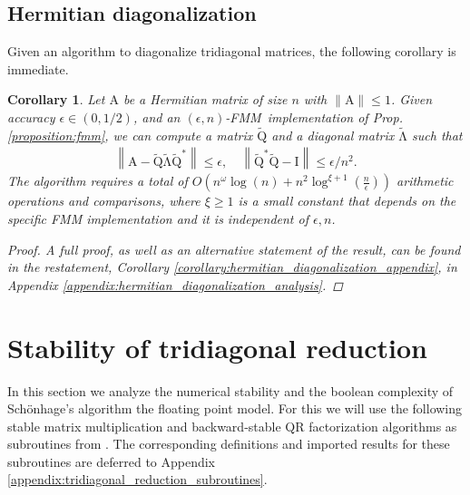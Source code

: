 \documentclass{article}
\newcommand{\lnorm}{\left\|}
\newcommand{\rnorm}{\right\|}
\newcommand{\lpar}{\left(}
\newcommand{\rpar}{\right)}
\newtheorem{corollary}{Corollary}[section]
\newcommand\matA{\boldsymbol{\mathrm{A}}}
\newcommand\matI{\boldsymbol{\mathrm{I}}}
\newcommand\matQtilde{\widetilde{\boldsymbol{\mathrm{Q}}}}
\newcommand\matLambdatilde{\widetilde{\boldsymbol{\mathrm{\Lambda}}}}
\newcommand{\cfmm}{\xi}
\newcommand{\fmmalgo}{FMM} \usepackage[utf8]{inputenc}
\begin{document}
    \subsection{Hermitian diagonalization}
    Given an algorithm to diagonalize tridiagonal matrices, the following corollary is immediate.
    \begin{corollary}
    \label{corollary:hermitian_diagonalization}
    Let $\matA$ be a Hermitian matrix of size $n$ with $\|\matA\|\leq 1$. Given accuracy $\epsilon\in(0,1/2)$, and an $(\epsilon,n)$-\fmmalgo\   implementation of Prop. \ref{proposition:fmm}, we can compute a matrix $\matQtilde$ and a diagonal matrix $\matLambdatilde$ such that
    \begin{align*}
        \lnorm \matA - \matQtilde\matLambdatilde\matQtilde^* \rnorm \leq \epsilon,
        \quad
        \lnorm \matQtilde^* \matQtilde - \matI \rnorm \leq \epsilon/n^2.
    \end{align*}
    The algorithm requires a total of $O\lpar n^\omega\log(n) + n^2\log^{\cfmm+1}(\tfrac{n}{\epsilon})\rpar$ arithmetic operations and comparisons, where $\xi\geq 1$ is a small constant that depends on the specific FMM implementation and it is independent of $\epsilon,n$.
    \begin{proof}
        A full proof, as well as an alternative statement of the result, can be found in the restatement, Corollary \ref{corollary:hermitian_diagonalization_appendix}, in Appendix \ref{appendix:hermitian_diagonalization_analysis}.
    \end{proof}
    \end{corollary}

\section{Stability of tridiagonal reduction}
\label{section:tridiagonal_reduction_stability}
In this section we analyze the numerical stability and the boolean complexity of  Schönhage's algorithm the floating point model. For this we will use the following stable matrix multiplication and backward-stable QR factorization algorithms as subroutines from \cite{demmel2007fastla,demmel2007fastmm}. 
The corresponding definitions and imported results for these subroutines are deferred to Appendix \ref{appendix:tridiagonal_reduction_subroutines}.
\end{document}
